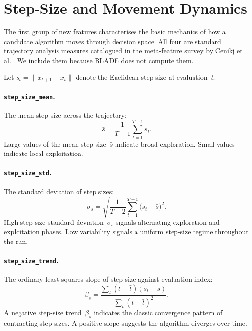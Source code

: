 \section{Step-Size and Movement Dynamics}
\label{sec:features:stepsize}

The first group of new features characterises the basic mechanics of how a
candidate algorithm moves through decision space.  All four are standard
trajectory analysis measures catalogued in the meta-feature survey by Cenikj et
al.~\cite{cenikj2026features} We include them because BLADE does not compute
them.

Let $s_t = \lVert x_{t+1} - x_t \rVert$ denote the Euclidean step size at
evaluation~$t$.

\paragraph{\texttt{step\_size\_mean}.}
The mean step size across the trajectory:
\begin{equation}
\label{eq:step_mean}
  \bar{s} = \frac{1}{T-1}\sum_{t=1}^{T-1} s_t.
\end{equation}
Large values of the mean step size~$\bar{s}$ indicate broad exploration.
Small values indicate local exploitation.

\paragraph{\texttt{step\_size\_std}.}
The standard deviation of step sizes:
\begin{equation}
\label{eq:step_std}
  \sigma_s = \sqrt{\frac{1}{T-2}\sum_{t=1}^{T-1}
    \bigl(s_t - \bar{s}\bigr)^2}.
\end{equation}
High step-size standard deviation~$\sigma_s$ signals alternating
exploration and exploitation phases. Low variability signals a uniform
step-size regime throughout the run.

\paragraph{\texttt{step\_size\_trend}.}
The ordinary least-squares slope of step size against evaluation index:
\begin{equation}
\label{eq:step_trend}
  \beta_s
    = \frac{\sum_{t}(t - \bar{t})(s_t - \bar{s})}
           {\sum_{t}(t - \bar{t})^2}.
\end{equation}
A negative step-size trend~$\beta_s$ indicates the classic convergence
pattern of contracting step sizes. A positive slope suggests the
algorithm diverges over time.

